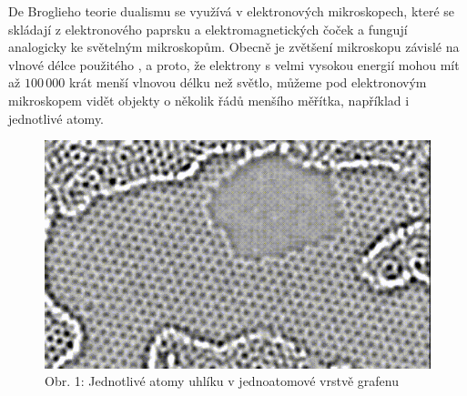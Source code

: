 \documentclass{../../../../style/mkimain}
\begin{document}
\noindent{}
\proborigin{}
\klein
De Broglieho teorie dualismu se využívá v elektronových mikroskopech, které se skládají z elektronového paprsku a
elektromagnetických čoček a fungují analogicky ke světelným mikroskopům.
Obecně je zvětšení mikroskopu závislé na vlnové délce použitého , a proto, že elektrony s velmi vysokou
energií mohou mít až $100\,000$ krát menší vlnovou délku než světlo, můžeme pod elektronovým mikroskopem vidět objekty o 
několik řádů menšího měřítka, například i jednotlivé atomy.

\begin{figure}[H]
    \begin{center}
    \includegraphics[scale=0.37]{grafen.png}\\
    \vspace{0.15cm}
        Obr. 1: Jednotlivé atomy uhlíku v jednoatomové vrstvě grafenu
    \end{center}
\end{figure}
\end{document}
